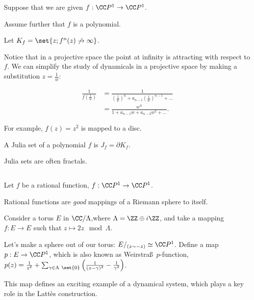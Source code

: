 \documentclass[11pt]{scrartcl}
\begin{document}
Suppose that we are given $f: \CC P^{1} \to \CC P^{1}$.

Assume further that $f$ is a polynomial.

Let $K_{f} = \set{z; f^{n}(z)\not \to \infty}$.

Notice that in a projective space the point at infinity is attracting
with respect to $f$. We can simplify the study of dynamicals in a
projective space by making a substitution $ z = \frac{1}{w}$:

\begin{align}
  \frac{1}{f(\frac{1}{w})} &= \frac{1}{(\frac{1}{w})^{n} + a_{n-1}(\frac{1}{w})^{n-1} + \dots}\\
                           &= \frac{w^{n}}{1+ a_{n-1}w + a_{n-2}w^{2}+\dots}.
\end{align}

For example, $f(z) = z^{2}$ is mapped to a disc.

\begin{definition}
  A Julia set of a polynomial $f$ is $J_{f} = \partial K_{f}$.
\end{definition}

\begin{note*}
  Julia sets are often fractals.
\end{note*}

\subsection{}

\begin{definition}
  Let $f$ be a rational function, $f: \CC P^{1} \to \CC P^{1}$. 


\begin{note*}
  Rational functions are \textit{good} mappings of a Riemann sphere to itself.
\end{note*}

Consider a torus $E$ in $\CC / \Lambda$,where
$\Lambda = \ZZ \oplus i \ZZ$, and take a mapping $f: E \to E$ such
that $z \mapsto 2z \mod \Lambda$.

Let's make a sphere out of our torus:
$E /_{(z\sim -z)} \simeq \CC P^{1}$. Define a map
$p: E \to \CC P^{1}$, which is also known as Weirstra\ss\ $p$-function,
$p(z) = \frac{1}{z^{2}} + \sum_{\gamma \in \Lambda \ \set{0}} \left(
  \frac{1}{(z-\gamma)^{2}} - \frac{1}{\gamma^{2}}\right)$.

\end{definition}

This map defines an exciting example of a dynamical system, which
plays a key role in the Latt\`es construction.
\end{document}
